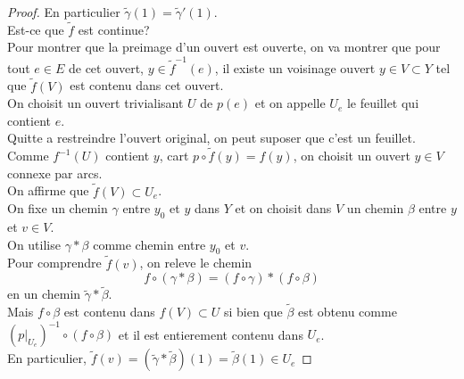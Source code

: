 \documentclass[../main.tex]{subfiles}
\begin{document}
\begin{proof}
En particulier $\tilde\gamma( 1) = \tilde\gamma' ( 1) $.\\
Est-ce que $\tilde f$ est continue?\\
Pour montrer que la preimage d'un ouvert est ouverte, on va montrer que pour tout $e\in E$ de cet ouvert, $y \in \tilde f^{-1}( e ) $, il existe un voisinage ouvert $y \in V \subset Y$ tel que $\tilde f ( V) $ est contenu dans cet ouvert.\\
On choisit un ouvert trivialisant $U$ de $p( e ) $ et on appelle $U_e$ le feuillet qui contient $e$.\\
Quitte a restreindre l'ouvert original, on peut suposer que c'est un feuillet.\\
Comme $f^{-1}( U) $ contient $y$, cart $p\circ \tilde f( y) = f( y) $, on choisit un ouvert $y \in V$ connexe par arcs.\\
On affirme que $\tilde f( V) \subset  U_e$.\\
On fixe un chemin $\gamma$ entre $y_0$ et $y$ dans $Y$ et on choisit dans $V$ un chemin $\beta$ entre $y$ et $v\in V$.\\
On utilise $\gamma \ast \beta$ comme chemin entre $y_0$ et $v$.\\
Pour comprendre $\tilde f ( v)$, on releve le chemin 
\[ 
f\circ ( \gamma\ast \beta ) = ( f\circ \gamma) \ast ( f\circ \beta) 
\]
en un chemin $\tilde\gamma\ast \tilde\beta$.\\
Mais $f\circ \beta$ est contenu dans $f( V) \subset U$ si bien que $\tilde \beta$ est obtenu comme $( p|_{U_e} )^{-1}\circ ( f\circ \beta) $ et il est entierement contenu dans $U_e$.\\
En particulier, $\tilde f( v) = ( \tilde\gamma\ast \tilde\beta) ( 1) = \tilde\beta( 1) \in U_e$ 

\end{proof}









						
\end{document}

